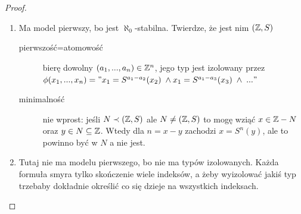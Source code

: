 \begin{proof}
  \begin{enumerate}
    \item Ma model pierwszy, bo jest $\aleph_0$-stabilna. Twierdze, że jest nim $(\mathbb{Z}, S)$
      \begin{description}
        \item[pierwszość=atomowość] bierę dowolny $(a_1,...,a_n)\in\mathbb{Z}^n$, jego typ jest izolowany przez $\phi(x_1,...,x_n)="x_1=S^{a_1-a_2}(x_2)\;\land x_1=S^{a_1-a_3}(x_3)\;\land\;..."$
        \item[minimalność] nie wprost: jeśli $N\prec (\mathbb{Z}, S)$ ale $N\neq (\mathbb{Z}, S)$ to mogę wziąć $x\in \mathbb{Z}-N$ oraz $y\in N\subseteq \mathbb{Z}$. Wtedy dla $n=x-y$ zachodzi $x=S^n(y)$, ale to powinno być w $N$ a nie jest.
      \end{description}
    \item Tutaj nie ma modelu pierwszego, bo nie ma typów izolowanych. Każda formuła smyra tylko skończenie wiele indeksów, a żeby wyizolować jakiś typ trzebaby dokładnie określić co się dzieje na wszystkich indeksach.
      

\end{enumerate}
\end{proof}

